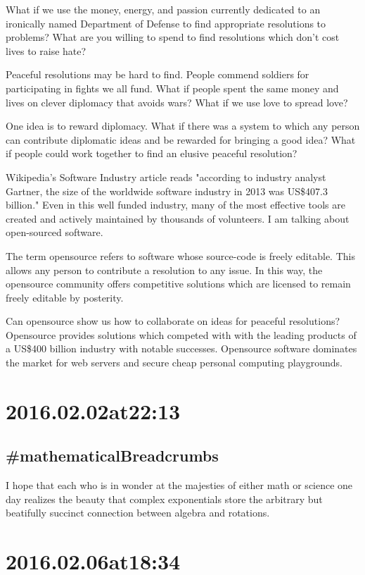 What if we use the money, energy, and passion currently dedicated to an ironically named Department of Defense to find appropriate resolutions to problems? What are you willing to spend to find resolutions which don't cost lives to raise hate?

Peaceful resolutions may be hard to find. People commend soldiers for participating in fights we all fund. What if people spent the same money and lives on clever diplomacy that avoids wars? What if we use love to spread love?

One idea is to reward diplomacy. What if there was a system to which any person can contribute diplomatic ideas and be rewarded for bringing a good idea? What if people could work together to find an elusive peaceful resolution?

Wikipedia's Software Industry article reads "according to industry analyst Gartner, the size of the worldwide software industry in 2013 was US\$407.3 billion." Even in this well funded industry, many of the most effective tools are created and actively maintained by thousands of volunteers. I am talking about open-sourced software.

The term opensource refers to software whose source-code is freely editable. This allows any person to contribute a resolution to any issue. In this way, the opensource community offers competitive solutions which are licensed to remain freely editable by posterity.

Can opensource show us how to collaborate on ideas for peaceful resolutions? Opensource provides solutions which competed with with the leading products of a US\$400 billion industry with notable successes. Opensource software dominates the market for web servers and secure cheap personal computing playgrounds.

\section*{ 2016.02.02at22:13 }
\subsection*{ \#mathematicalBreadcrumbs }
I hope that each who is in wonder at the majesties of either math or science one day realizes the beauty that complex exponentials store the arbitrary but beatifully succinct connection between algebra and rotations.

\section*{ 2016.02.06at18:34 }
